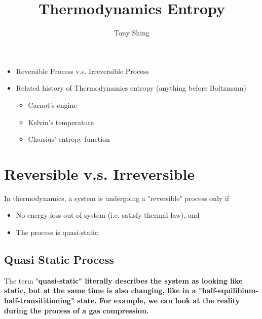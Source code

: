 \documentclass[class=article, crop=false, 12pt]{standalone}
\author{Tony Shing}
\title{Thermodynamics Entropy}
\begin{document}
\maketitle


\begin{overview}
    \begin{itemize}
        \item Reversible Process v.s. Irreversible Process
        \item Related history of Thermodynamics entropy (anything before Boltzmann)
        \begin{itemize}
            \item Carnot's engine
            \item Kelvin's temperature
            \item Clausius' entropy function
        \end{itemize}
    \end{itemize}

\end{overview}




\section{Reversible v.s. Irreversible}

In thermodynamics, a system is undergoing a "reversible" process only if
\begin{itemize}
    \item No energy loss out of system (i.e. satisfy thermal  law), and
    \item The process is quasi-static.
\end{itemize}

\subsection{Quasi Static Process}

The term "\bf{quasi-static}" literally describes the system as looking like static,
but at the same time is also changing, 
like in a "half-equilibium-half-transititioning" state.
For example, we can look at the reality during the process of a gas compression.
\end{document}
